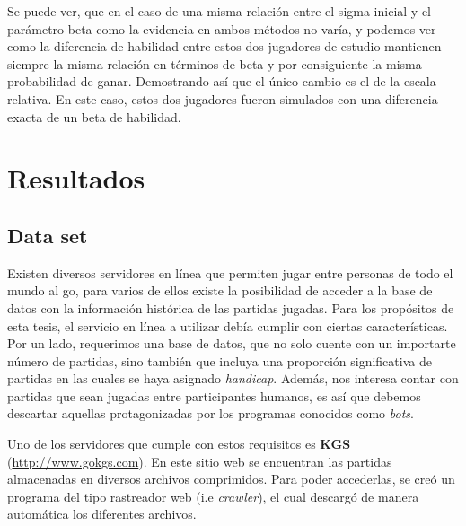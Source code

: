 \documentclass[11pt,twoside,spanish]{report} %
\begin{document}
Se puede ver, que en el caso de una misma relaci\'on entre el sigma inicial y el par\'ametro beta como la evidencia en ambos m\'etodos  no var\'ia, y podemos ver como la diferencia de habilidad entre estos dos jugadores de estudio mantienen siempre la misma relaci\'on en t\'erminos de beta y por consiguiente la misma probabilidad de ganar.
Demostrando as\'i que el \'unico cambio es el de la escala relativa.
En este caso, estos dos jugadores fueron simulados con una diferencia exacta de un beta de habilidad.











\chapter{Resultados}

\section{Data set}


Existen diversos servidores en l\'inea que permiten jugar entre personas de todo el mundo al go, para varios de ellos existe la posibilidad de acceder a la base de datos con la informaci\'on hist\'orica de las partidas jugadas.
Para los prop\'ositos de esta tesis, el servicio en l\'inea a utilizar deb\'ia cumplir con ciertas caracter\'isticas.
Por un lado, requerimos una base de datos, que no solo cuente con un importarte n\'umero de partidas, sino tambi\'en que incluya una proporci\'on significativa de partidas en las cuales se haya asignado \textit{handicap}.
Adem\'as, nos interesa contar con partidas que sean jugadas entre participantes humanos, es as\'i que debemos descartar aquellas protagonizadas por los programas conocidos como \textit{bots}.

Uno de los servidores que cumple con estos requisitos es \textbf{KGS} (\url{http://www.gokgs.com}).
En este sitio web se encuentran las partidas almacenadas en diversos archivos comprimidos.
Para poder accederlas, se cre\'o un programa del tipo rastreador web (i.e \textit{crawler}), el cual descarg\'o de manera autom\'atica los diferentes archivos.
\end{document}
